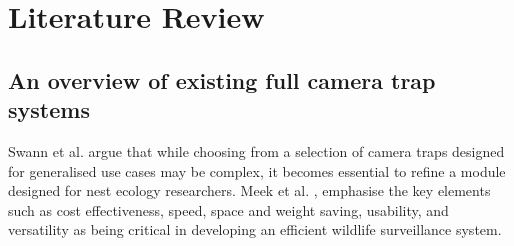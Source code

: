 \documentclass[class=report,11pt,crop=false]{standalone}
\begin{document}
\ifstandalone
\tableofcontents
\fi
\chapter{Literature Review \label{ch:literature}}



\section{An overview of existing full camera trap systems}


Swann et al. \cite{swann2011evaluating} argue that while choosing from a selection of camera traps designed for generalised use cases may be complex, it becomes essential to refine a module designed for nest ecology researchers. Meek et al. \cite{meek2012user}, emphasise the key elements such as cost effectiveness, speed, space and weight saving, usability, and versatility as being critical in developing an efficient wildlife surveillance system.  
\end{document}
